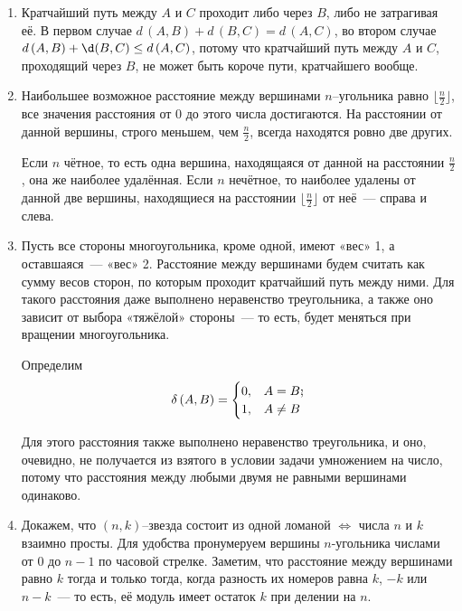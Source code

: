 \documentclass[10pt]{scrbook} \usepackage{modules/nonstahp_book}
\begin{document}
\def\vfi{\varphi}

\begin{enumerate}

	\item Кратчайший путь между $A$ и $C$ проходит либо через $B$, либо не затрагивая её. В первом случае $d\,(A,B) + d\,(B,C) = d\,(A,C)$, во втором случае $d\,(A,B) + \d(B,C) \le d\,(A,C)$, потому что кратчайший путь между $A$ и $C$, проходящий через $B$, не может быть короче пути, кратчайшего вообще.

	\item Наибольшее возможное расстояние между вершинами $n$--угольника равно $\lfloor \tfrac{n}{2} \rfloor$, все значения расстояния от 0 до этого числа достигаются. На расстоянии от данной вершины, строго меньшем, чем $\tfrac{n}{2}$, всегда находятся ровно две других.
	
	Если $n$ чётное, то есть одна вершина, находящаяся от данной на расстоянии $\tfrac{n}{2}$, она же наиболее удалённая. Если $n$ нечётное, то наиболее удалены от данной две вершины, находящиеся на расстоянии $\lfloor \tfrac{n}{2} \rfloor$ от неё~— справа и слева.

	\item Пусть все стороны многоугольника, кроме одной, имеют «вес» 1, а оставшаяся~— «вес» 2. Расстояние между вершинами будем считать как сумму весов сторон, по которым проходит кратчайший путь между ними. Для такого расстояния даже выполнено неравенство треугольника, а также оно зависит от выбора «тяжёлой» стороны~— то есть, будет меняться при вращении многоугольника.

	Определим
	$$\delta\,(A,B) = \begin{cases} 0, & A=B\scolon\\ 1, & A \ne B \end{cases}$$

	Для этого расстояния также выполнено неравенство треугольника, и оно, очевидно, не получается из взятого в условии задачи умножением на число, потому что расстояния между любыми двумя не равными вершинами одинаково.

\item Докажем, что $(n,k)$--звезда состоит из одной ломаной $\Longleftrightarrow$ числа $n$ и $k$ взаимно просты. Для удобства пронумеруем вершины $n$-угольника числами от $0$ до $n-1$ по часовой стрелке. Заметим, что расстояние между вершинами равно $k$ тогда и только тогда, когда разность их номеров равна $k$, $-k$ или $n-k$~— то есть, её модуль имеет остаток $k$ при делении на $n$.


\end{enumerate}
\end{document}
